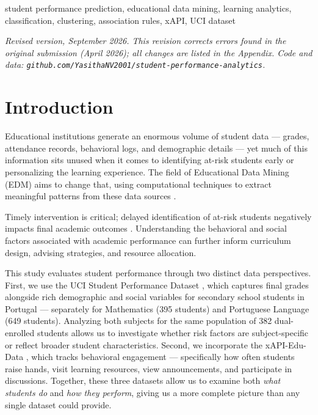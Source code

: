 \documentclass[conference]{IEEEtran}
\begin{document}
\begin{IEEEkeywords}
student performance prediction, educational data mining, learning analytics, classification, clustering, association rules, xAPI, UCI dataset
\end{IEEEkeywords}

\noindent\textit{Revised version, September 2026. This revision corrects errors found in the original submission (April 2026); all changes are listed in the Appendix. Code and data: \texttt{github.com/YasithaNV2001/student-performance-analytics}.}

\section{Introduction}

Educational institutions generate an enormous volume of student data — grades, attendance records, behavioral logs, and demographic details — yet much of this information sits unused when it comes to identifying at-risk students early or personalizing the learning experience. The field of Educational Data Mining (EDM) aims to change that, using computational techniques to extract meaningful patterns from these data sources \cite{romero2010educational}.

Timely intervention is critical; delayed identification of at-risk students negatively impacts final academic outcomes \cite{baker2010data}. Understanding the behavioral and social factors associated with academic performance can further inform curriculum design, advising strategies, and resource allocation.

This study evaluates student performance through two distinct data perspectives. First, we use the UCI Student Performance Dataset \cite{cortez2008using}, which captures final grades alongside rich demographic and social variables for secondary school students in Portugal — separately for Mathematics (395 students) and Portuguese Language (649 students). Analyzing both subjects for the same population of 382 dual-enrolled students allows us to investigate whether risk factors are subject-specific or reflect broader student characteristics. Second, we incorporate the xAPI-Edu-Data \cite{amrieh2016mining}, which tracks behavioral engagement — specifically how often students raise hands, visit learning resources, view announcements, and participate in discussions. Together, these three datasets allow us to examine both \textit{what students do} and \textit{how they perform}, giving us a more complete picture than any single dataset could provide.
\end{document}
